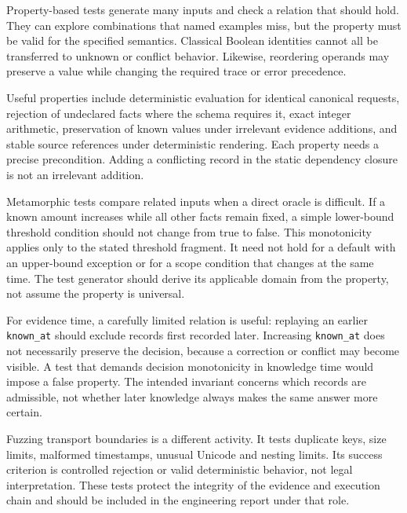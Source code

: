 Property-based tests generate many inputs and check a relation that should hold.
They can explore combinations that named examples miss, but the property must
be valid for the specified semantics. Classical Boolean identities cannot all be
transferred to unknown or conflict behavior. Likewise, reordering operands may
preserve a value while changing the required trace or error precedence.

Useful properties include deterministic evaluation for identical canonical
requests, rejection of undeclared facts where the schema requires it, exact
integer arithmetic, preservation of known values under irrelevant evidence
additions, and stable source references under deterministic rendering. Each
property needs a precise precondition. Adding a conflicting record in the static
dependency closure is not an irrelevant addition.


Metamorphic tests compare related inputs when a direct oracle is difficult. If a
known amount increases while all other facts remain fixed, a simple lower-bound
threshold condition should not change from true to false. This monotonicity
applies only to the stated threshold fragment. It need not hold for a default
with an upper-bound exception or for a scope condition that changes at the same
time. The test generator should derive its applicable domain from the property,
not assume the property is universal.

For evidence time, a carefully limited relation is useful: replaying an earlier
\texttt{known\_at} should exclude records first recorded later. Increasing
\texttt{known\_at} does not necessarily preserve the decision, because a correction
or conflict may become visible. A test that demands decision monotonicity in
knowledge time would impose a false property. The intended invariant concerns
which records are admissible, not whether later knowledge always makes the same
answer more certain.

Fuzzing transport boundaries is a different activity. It tests duplicate keys,
size limits, malformed timestamps, unusual Unicode and nesting limits. Its
success criterion is controlled rejection or valid deterministic behavior, not
legal interpretation. These tests protect the integrity of the evidence and
execution chain and should be included in the engineering report under that role.

